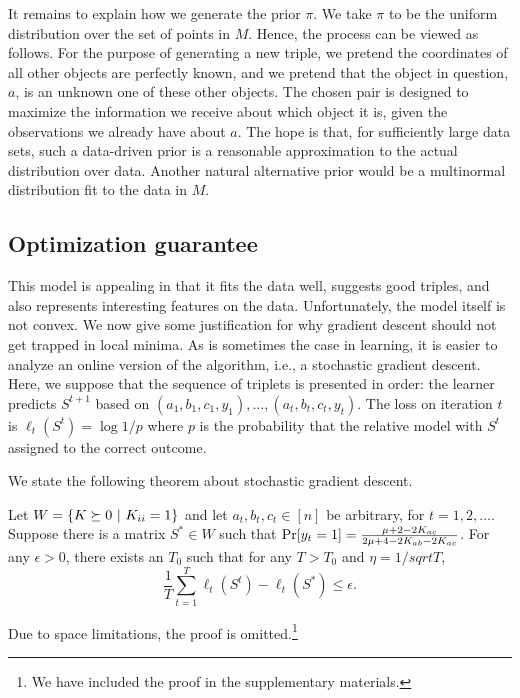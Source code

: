 \documentclass{article}
\begin{document}
It remains to explain how we generate the prior $\pi$.  We take $\pi$
to be the uniform distribution over the set of points in $M$.  Hence,
the process can be viewed as follows.  For the purpose of generating a
new triple, we pretend the coordinates of all other objects are
perfectly known, and we pretend that the object in question, $a$, is
an unknown one of these other objects.  The chosen pair is designed to
maximize the information we receive about which object it is, given
the observations we already have about $a$.  The hope is that, for
sufficiently large data sets, such a data-driven prior is a reasonable
approximation to the actual distribution over data.  Another natural
alternative prior would be a multinormal distribution fit to the data
in $M$.




\subsection{Optimization guarantee}\label{sec:theory}

This model is appealing in that it fits the data well, suggests good triples, and also represents interesting features on the data.  Unfortunately, the model itself is not convex.  We now give some justification for why gradient descent should not get trapped in local minima.  As is sometimes the case in learning, it is easier to analyze an online version of the algorithm, i.e., a stochastic gradient descent.  Here, we suppose that the sequence of triplets is presented in order: the learner predicts $S^{t+1}$ based on $(a_1,b_1,c_1,y_1),\ldots,(a_t,b_t,c_t,y_t)$.  The loss on iteration $t$ is $\ell_t(S^t)=\log 1/p$ where $p$ is the probability that the relative model with $S^t$ assigned to the correct outcome.

We state the following theorem about stochastic gradient descent.
\begin{theorem}
Let $W = \{\S \succeq 0~|~\S_{ii}=1\}$ and let $a_t,b_t,c_t \in [n]$ be arbitrary, for $t=1,2,\ldots$.  Suppose there is a matrix $S^*\in W$ such that $\Pr[y_t=1]=\frac{\mu+2-2\S_{ac}}{2\mu+4-2\S_{ab}-2\S_{ac}}$.  For any $\epsilon>0$, there exists an $T_0$ such that for any $T>T_0$ and $\eta=1/sqrt{T}$,
$$\frac{1}{T}\sum_{t=1}^T \ell_t(S^t)-\ell_t(S^*) \leq \epsilon.$$
\end{theorem}
Due to space limitations, the proof is omitted.\footnote{We have included the proof in the supplementary materials.}
\end{document}
